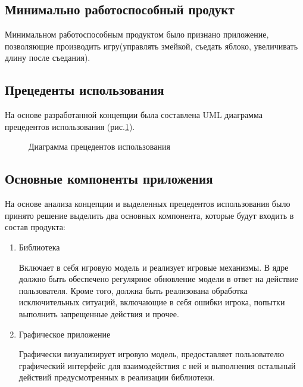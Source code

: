 	\subsection{Минимально работоспособный продукт}
	
	Минимальном работоспособным продуктом было признано приложение, позволяющие производить игру(управлять змейкой, съедать яблоко, увеличивать длину после съедания). 
	
	\subsection{Прецеденты использования}
	
	На основе разработанной концепции была составлена UML диаграмма прецедентов использования (рис.\ref{pic:use_case}).
	
	\begin{figure}[H]
		\begin{center}
			\caption{Диаграмма прецедентов использования}
			\label{pic:use_case}
		\end{center}
	\end{figure}
	
	\subsection{Основные компоненты приложения}
	
	На основе анализа концепции и выделенных прецедентов использования было принято решение выделить два основных компонента, которые будут входить в состав продукта:
	
	\begin{enumerate}
		\item Библиотека
		
		Включает в себя игровую модель и реализует игровые механизмы. В ядре должно быть обеспечено регулярное обновление модели в ответ на действие пользователя. Кроме того, должна быть реализована обработка исключительных ситуаций, включающие в себя ошибки игрока, попытки выполнить запрещенные действия и прочее.
		
		\item Графическое приложение 
		
		Графически визуализирует игровую модель, предоставляет пользователю графический интерфейс для взаимодействия с ней и выполнения остальный действий предусмотренных в реализации библиотеки. 
	\end{enumerate}
	
